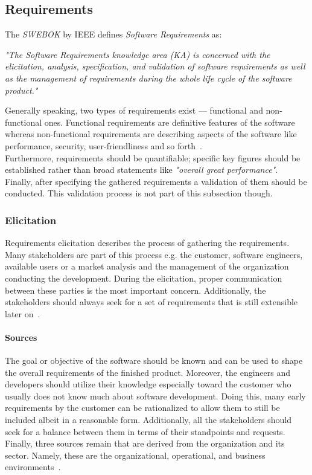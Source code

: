 \documentclass[12pt,a4paper,twoside]{report}
\begin{document}
\subsection{Requirements} \label{subsect:requirements}

The \textit{SWEBOK} by IEEE defines \textit{Software Requirements} as:
\begin{displayquote}
\emph{"The Software Requirements knowledge area (KA) is concerned with
the elicitation, analysis, specification, and validation of software requirements
as well as the management of requirements during the whole
life cycle of the software product."}~\cite{swebok}
\end{displayquote}
Generally speaking, two types of requirements exist --- functional and non-functional ones.
Functional requirements are definitive features of the software whereas non-functional
requirements are describing aspects of the software like performance, security,
user-friendliness and so forth~\cite{sommerville-se}.\\
Furthermore, requirements should be quantifiable; specific key figures should be established
rather than broad statements like \textit{"overall great performance"}.\\
Finally, after specifying the gathered requirements a validation of them should be conducted.
This validation process is not part of this subsection though.


\subsubsection{Elicitation}
Requirements elicitation describes the process of gathering the requirements.
Many stakeholders are part of this process e.g. the customer, software engineers,
available users or a market analysis and the management of the organization conducting
the development.
During the elicitation, proper communication between these parties is the most important
concern. Additionally, the stakeholders should always seek for a set of
requirements that is still extensible later on~\cite{swebok}.

\paragraph{Sources}
The goal or objective of the software should be known and can be used to
shape the overall requirements of the finished product.
Moreover, the engineers and developers should utilize their knowledge especially
toward the customer who usually does not know much about software development.
Doing this, many early requirements by the customer can be rationalized to allow
them to still be included albeit in a reasonable form.
Additionally, all the stakeholders should seek for a balance between them in
terms of their standpoints and requests.\\
Finally, three sources remain that are derived from the organization and its sector.
Namely, these are the organizational, operational, and business environments~\cite{swebok}.
\end{document}
